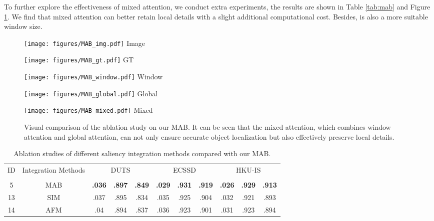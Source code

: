\documentclass[lettersize,journal]{IEEEtran}
\begin{document}
To further explore the effectiveness of mixed attention, we conduct extra experiments, the results are shown in Table \ref{tab:mab} and Figure \ref{fig:MAB}. We find that mixed attention can better retain local details with a slight additional computational cost. Besides,  is also a more suitable window size. 
\begin{figure}
	\centering \begin{minipage}[t]{0.088\textwidth}
		\centering
		\texttt{[image: figures/MAB\_img.pdf]}
		\centering\footnotesize{Image}
	\end{minipage}
	\begin{minipage}[t]{0.088\textwidth}
		\centering
		\texttt{[image: figures/MAB\_gt.pdf]}
		\centering\footnotesize{GT}
	\end{minipage}
	\begin{minipage}[t]{0.088\textwidth}
		\centering
		\texttt{[image: figures/MAB\_window.pdf]}
		\centering\footnotesize{Window}
	\end{minipage}
	\begin{minipage}[t]{0.088\textwidth}
		\centering
		\texttt{[image: figures/MAB\_global.pdf]}
		\centering\footnotesize{Global}
	\end{minipage}
	\begin{minipage}[t]{0.088\textwidth}
		\centering
		\texttt{[image: figures/MAB\_mixed.pdf]}
		\centering\footnotesize{Mixed}
	\end{minipage}
	\begin{minipage}[t]{0.1\textwidth}\end{minipage}
	\par\;\caption{Visual comparison of the ablation study on our MAB. 
		It can be seen that the mixed attention, which combines window attention and global attention, can not only ensure accurate object localization but also effectively preserve local details. }
	\label{fig:MAB}
\end{figure}
\begin{table}
	\centering
	\scriptsize
	\caption{Ablation studies of different saliency integration methods compared with our MAB. }
	\label{tab:mab_vs_sims}
	\setlength\tabcolsep{0.5mm}
	\begin{tabular}{c|c|ccc|ccc|ccc}\hline
		\multirow{2}{*}{ID} & \multirow{2}{*}{Integration Methods} & \multicolumn{3}{c|}{DUTS} & \multicolumn{3}{c|}{ECSSD} & \multicolumn{3}{c}{HKU-IS}\\
		&&  &  &  &  &  &  &  &  &  \\
		\hline
		5 & MAB & \textbf{.036} & \textbf{.897} & \textbf{.849} & \textbf{.029} & \textbf{.931} & \textbf{.919} & \textbf{.026} & \textbf{.929} & \textbf{.913} \\
		13 & SIM\cite{MiNet} & .037 & {.895} & {.834} & {.035} & {.925} & {.904} & {.032} & {.921} & {.893} \\
		14 & AFM\cite{Ma_Xia_Li_2021} & .04 & {.894} & {.837} & {.036} & {.923} & {.901} & {.031} & {.923} & {.894} \\
		
\hline 
	\end{tabular}
\end{table}
\end{document}
